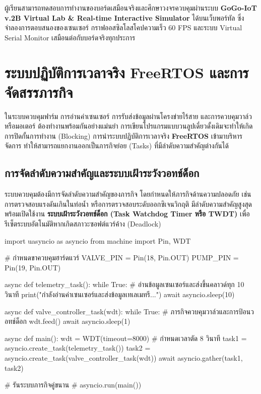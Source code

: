 ผู้เรียนสามารถทดสอบการทำงานของบอร์ดเสมือนจริงและศึกษาวงจรควบคุมผ่านระบบ \textbf{GoGo-IoT v.2B Virtual Lab \& Real-time Interactive Simulator} ได้บนเว็บพอร์ทัล ซึ่งจำลองการตอบสนองของเซนเซอร์ กราฟออสซิลโลสโคปความเร็ว 60 FPS และระบบ Virtual Serial Monitor เสมือนต่อกับบอร์ดจริงทุกประการ


\section{ระบบปฏิบัติการเวลาจริง FreeRTOS และการจัดสรรภารกิจ}

ในระบบควบคุมฟาร์ม การอ่านค่าเซนเซอร์ การรับส่งข้อมูลผ่านโครงข่ายไร้สาย และการควบคุมวาล์วหรือมอเตอร์ ต้องทำงานพร้อมกันอย่างแม่นยำ การเขียนโปรแกรมแบบวนลูปเดี่ยวดั้งเดิมจะทำให้เกิดการปิดกั้นการทำงาน (Blocking) การนำระบบปฏิบัติการเวลาจริง \textbf{FreeRTOS} เข้ามาบริหารจัดการ ทำให้สามารถแยกงานออกเป็นภารกิจย่อย (Tasks) ที่มีลำดับความสำคัญต่างกันได้

\subsection{การจัดลำดับความสำคัญและระบบเฝ้าระวังวอทช์ด็อก}

ระบบควบคุมต้องมีการจัดลำดับความสำคัญของภารกิจ โดยกำหนดให้ภารกิจด้านความปลอดภัย เช่น การตรวจสอบแรงดันเกินในท่อน้ำ หรือการตรวจสอบระดับออกซิเจนวิกฤติ มีลำดับความสำคัญสูงสุด พร้อมเปิดใช้งาน \textbf{ระบบเฝ้าระวังวอทช์ด็อก (Task Watchdog Timer หรือ TWDT)} เพื่อรีเซ็ตระบบอัตโนมัติหากเกิดสภาวะซอฟต์แวร์ค้าง (Deadlock)

\begin{pythonbox}
import uasyncio as asyncio
from machine import Pin, WDT

# กำหนดขาควบคุมฮาร์ดแวร์
VALVE_PIN = Pin(18, Pin.OUT)
PUMP_PIN = Pin(19, Pin.OUT)

async def telemetry_task():
    while True:
        # อ่านข้อมูลเซนเซอร์และส่งขึ้นคลาวด์ทุก 10 วินาที
        print("กำลังอ่านค่าเซนเซอร์และส่งข้อมูลเทเลเมทรี...")
        await asyncio.sleep(10)

async def valve_controller_task(wdt):
    while True:
        # ภารกิจควบคุมวาล์วและการป้อนวอทช์ด็อก
        wdt.feed()
        await asyncio.sleep(1)

async def main():
    wdt = WDT(timeout=8000) # กำหนดเวลาตัด 8 วินาที
    task1 = asyncio.create_task(telemetry_task())
    task2 = asyncio.create_task(valve_controller_task(wdt))
    await asyncio.gather(task1, task2)

# รันระบบภารกิจคู่ขนาน
# asyncio.run(main())
\end{pythonbox}

